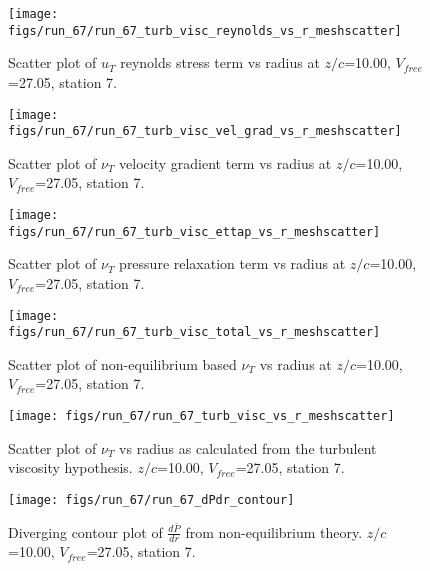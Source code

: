 \begin{figure}[H]
\centering
\texttt{[image: figs/run\_67/run\_67\_turb\_visc\_reynolds\_vs\_r\_meshscatter]}
\caption{Scatter plot of $
u_T$ reynolds stress term vs radius at $z/c$=10.00, $V_{free}$=27.05, station 7.}
\end{figure}


\begin{figure}[H]
\centering
\texttt{[image: figs/run\_67/run\_67\_turb\_visc\_vel\_grad\_vs\_r\_meshscatter]}
\caption{Scatter plot of $\nu_T$ velocity gradient term vs radius at $z/c$=10.00, $V_{free}$=27.05, station 7.}
\end{figure}


\begin{figure}[H]
\centering
\texttt{[image: figs/run\_67/run\_67\_turb\_visc\_ettap\_vs\_r\_meshscatter]}
\caption{Scatter plot of $\nu_T$ pressure relaxation term vs radius at $z/c$=10.00, $V_{free}$=27.05, station 7.}
\end{figure}


\begin{figure}[H]
\centering
\texttt{[image: figs/run\_67/run\_67\_turb\_visc\_total\_vs\_r\_meshscatter]}
\caption{Scatter plot of non-equilibrium based $\nu_T$ vs radius at $z/c$=10.00, $V_{free}$=27.05, station 7.}
\end{figure}


\begin{figure}[H]
\centering
\texttt{[image: figs/run\_67/run\_67\_turb\_visc\_vs\_r\_meshscatter]}
\caption{Scatter plot of $\nu_T$ vs radius as calculated from the turbulent viscosity hypothesis. $z/c$=10.00, $V_{free}$=27.05, station 7.}
\end{figure}


\begin{figure}[H]
\centering
\texttt{[image: figs/run\_67/run\_67\_dPdr\_contour]}
\caption{Diverging contour plot of $\frac{d\bar{P}}{dr}$ from non-equilibrium theory. $z/c$=10.00, $V_{free}$=27.05, station 7.}
\end{figure}


